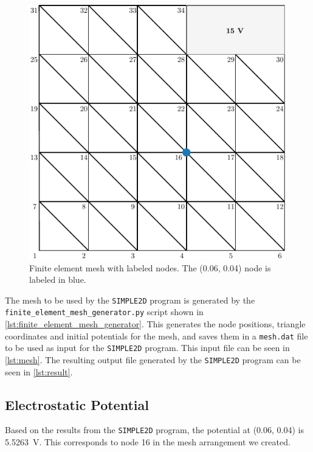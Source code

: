 \documentclass[a4paper,titlepage]{article}
\newcommand{\code}[1]{\texttt{#1}}
\begin{document}
	\begin{figure}[!htb]
		\centering
		\includegraphics[width=\columnwidth]{plots/finite_element_mesh.pdf}
		\caption
		{Finite element mesh with labeled nodes. The (0.06, 0.04) node is labeled in blue.}
		\label{fig:finite_element_mesh}
	\end{figure}
	
	
	The mesh to be used by the \texttt{SIMPLE2D} program is generated by the \texttt{finite_element_mesh_generator.py} script shown in \cref{lst:finite_element_mesh_generator}. This generates the node positions, triangle coordinates and initial potentials for the mesh, and saves them in a \code{mesh.dat} file to be used as input for the \code{SIMPLE2D} program. This input file can be seen in \cref{lst:mesh}. The resulting output file generated by the \code{SIMPLE2D} program can be seen in \cref{lst:result}.
	
	\subsection{Electrostatic Potential}
	
	Based on the results from the \texttt{SIMPLE2D} program, the potential at (0.06, 0.04) is \SI{5.5263}{\volt}. This corresponds to node 16 in the mesh arrangement we created.
	
\end{document}
